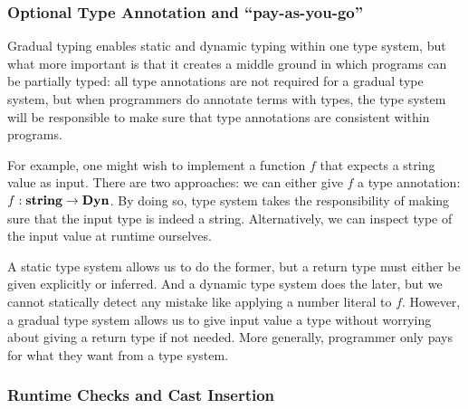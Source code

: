 




\subsubsection{Optional Type Annotation and ``pay-as-you-go''}

Gradual typing enables static and dynamic typing within one type system,
but what more important is that it creates a middle ground in which programs
can be partially typed: all type annotations are not required for a gradual type system,
but when programmers do annotate terms with types,
the type system will be responsible to make sure that type annotations are consistent
within programs.

For example, one might wish to implement a function $f$ that expects a string value
as input. There are two approaches: we can either give $f$ a type annotation:
$f : \textbf{string} \rightarrow \textbf{Dyn}$. By doing so, type system takes the responsibility
of making sure that the input type is indeed a string. Alternatively,
we can inspect type of the input value at runtime ourselves.

A static type system allows us to do the former, but a return type must either
be given explicitly or inferred. And a dynamic type system does the later, but
we cannot statically detect any mistake like applying a number literal to $f$.
However, a gradual type system allows us to give input value a type
without worrying about giving a return type if not needed.
More generally, programmer only pays for what they want from a type system.


\subsubsection{Runtime Checks and Cast Insertion}

